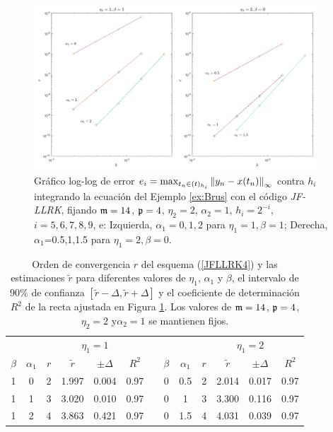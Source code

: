 \begin{figure}[htb]
	\centering
	\includegraphics[width=0.95\textwidth]{Graphics/lldp-fj/in_new.png}
	\caption{Gráfico log-log de error $e_i=\max_{t_n\in(t)_{h_i}}\left\lVert y_n-x(t_n) \right\rVert_\infty$ contra $h_i$ integrando la ecuación del Ejemplo \ref{ex:Brus} con el código \textit{JF-LLRK}, fijando $\mathfrak{m}=14$, $\mathfrak{p}=4$, $\eta_2=2$, $\alpha_2=1$, $h_i=2^{-i}$, $i=5,6,7,8,9$, e: Izquierda, $\alpha_1=0,1,2$ para $\eta_1=1,\beta=1$; Derecha, $\alpha_1$=0.5,1,1.5 para $\eta_1=2,\beta=0$.}
	\label{Fig3}
\end{figure}


\begin{table}[htb]
	\centering
	\caption{
        Orden de convergencia $r$ del esquema (\ref{JFLLRK4}) y las estimaciones $\widetilde{r}$ para diferentes valores de  $\eta_1$, $\alpha_1$ y $\beta$, el intervalo de $90\%$ de confianza $[\widetilde{r}-\varDelta,\widetilde{r}+\varDelta]$ y el coeficiente de determinación $R^2$ de la recta ajustada en Figura \ref{Fig3}. Los valores de $\mathfrak{m}=14$, $\mathfrak{p}=4$, $\eta_2=2$ y$\alpha_2=1$ se mantienen fijos.}
	\begin{adjustbox}{width=0.8\columnwidth,center}
		\begin{tabular}{ccccccccccccc}
			\hline
			&  & \multicolumn{4}{c}{$\eta _{1}=1$} &  &  &  & \multicolumn{4}{c}{$\eta
				_{1}=2$} \\ \cline{3-6}\cline{10-13}
			$\beta $ & $\alpha _{1}$ & $r$ & $\widetilde{r}$ & $\pm \varDelta$ & $R^{2}$
			&  & $\beta $ & $\alpha _{1}$ & $r$ & $\widetilde{r}$ & $\pm \varDelta$ & $%
			R^{2}$ \\ \hline
			1 & 0 & 2 & 1.997 & 0.004 & 0.97 &  & 0 & 0.5 & 2 & 2.014 & 0.017 & 0.97 \\ 
			1 & 1 & 3 & 3.020 & 0.010 & 0.97 &  & 0 & 1 & 3 & 3.300 & 0.116 & 0.97 \\ 
			1 & 2 & 4 & 3.863 & 0.421 & 0.97 &  & 0 & 1.5 & 4 & 4.031 & 0.039 & 0.97 \\ 
			\hline
		\end{tabular}
	\end{adjustbox}
	\label{tab:in}
\end{table}

